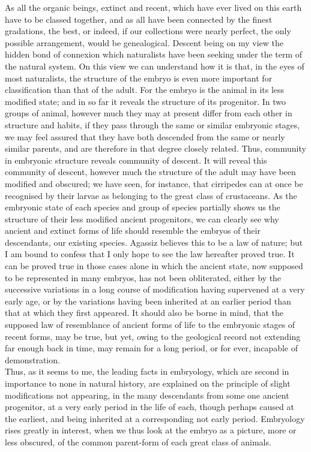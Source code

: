 \indent As all the organic beings, extinct and recent, which have ever lived on this earth have to be classed together, and as all have been connected by the finest gradations, the best, or indeed, if our collections were nearly perfect, the only possible arrangement, would be genealogical. Descent being on my view the hidden bond of connexion which naturalists have been seeking under the term of the natural system. On this view we can understand how it is that, in the eyes of most naturalists, the structure of the embryo is even more important for classification than that of the adult. For the embryo is the animal in its less modified state; and in so far it reveals the structure of its progenitor. In two groups of animal, however much they may at present differ from each other in structure and habits, if they pass through the same or similar embryonic stages, we may feel assured that they have both descended from the same or nearly similar parents, and are therefore in that degree closely related. Thus, community in embryonic structure reveals community of descent. It will reveal this community of descent, however much the structure of the adult may have been modified and obscured; we have seen, for instance, that cirripedes can at once be recognised by their larvae as belonging to the great class of crustaceans. As the embryonic state of each species and group of species partially shows us the structure of their less modified ancient progenitors, we can clearly see why ancient and extinct forms of life should resemble the embryos of their descendants, our existing species. Agassiz believes this to be a law of nature; but I am bound to confess that I only hope to see the law hereafter proved true. It can be proved true in those cases alone in which the ancient state, now supposed to be represented in many embryos, has not been obliterated, either by the successive variations in a long course of modification having supervened at a very early age, or by the variations having been inherited at an earlier period than that at which they first appeared. It should also be borne in mind, that the supposed law of resemblance of ancient forms of life to the embryonic stages of recent forms, may be true, but yet, owing to the geological record not extending far enough back in time, may remain for a long period, or for ever, incapable of demonstration.~\\
\indent Thus, as it seems to me, the leading facts in embryology, which are second in importance to none in natural history, are explained on the principle of slight modifications not appearing, in the many descendants from some one ancient progenitor, at a very early period in the life of each, though perhaps caused at the earliest, and being inherited at a corresponding not early period. Embryology rises greatly in interest, when we thus look at the embryo as a picture, more or less obscured, of the common parent-form of each great class of animals.~\\

